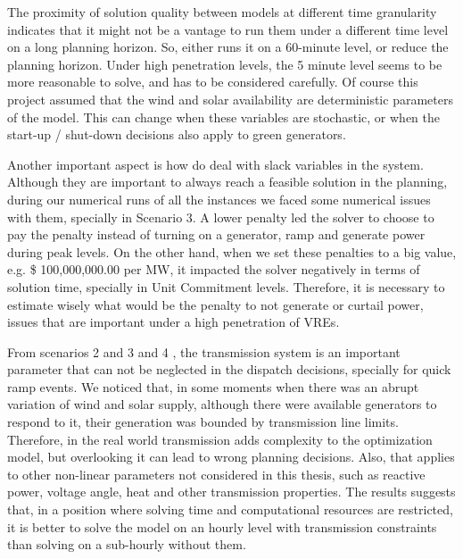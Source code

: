 \documentclass[12pt,LUDisStyle,twosided]{book}
\begin{document}
The proximity of solution quality between models at different time granularity indicates that it might not be a vantage to run them under a different time level on a long planning horizon. So, either runs it on a 60-minute level, or reduce the planning horizon. Under high penetration levels, the 5 minute level seems to be more reasonable to solve, and has to be considered carefully. Of course this project assumed that the wind and solar availability are deterministic parameters of the model. This can change when these variables are stochastic, or when the start-up / shut-down decisions also apply to green generators.

Another important aspect is how do deal with slack variables in the system. Although they are important to always reach a feasible solution in the planning, during our numerical runs of all the instances we faced some numerical issues with them, specially in Scenario 3. A lower penalty led the solver to choose to pay the penalty instead of turning on a generator, ramp and generate power during peak levels. On the other hand, when we set these penalties to a big value, e.g. \$ 100,000,000.00 per MW, it impacted the solver negatively in terms of solution time, specially in Unit Commitment levels. Therefore, it is necessary to estimate wisely what would be the penalty to not generate or curtail power, issues that are important under a high penetration of VREs.

From scenarios 2 and 3 and 4 , the transmission system is an important parameter that can not be neglected in the dispatch decisions, specially for quick ramp events. We noticed that, in some moments when there was an abrupt variation of wind and solar supply, although there were available generators to respond to it, their generation was bounded by transmission line limits. Therefore, in the real world transmission adds complexity to the optimization model, but overlooking it can lead to wrong planning decisions. Also, that applies to other non-linear parameters not considered in this thesis, such as reactive power, voltage angle, heat and other transmission properties. The results suggests that, in a position where solving time and computational resources are restricted, it is better to solve the model on an hourly level with transmission constraints than solving on a sub-hourly without them.
\end{document}
